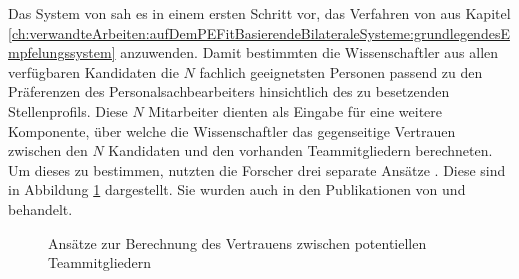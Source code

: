 Das System von \textcite[S. 4ff.]{malinowski:2005} sah es in einem ersten Schritt vor, das Verfahren von \textcite[S. 8ff.]{faerber:2003} aus Kapitel \ref{ch:verwandteArbeiten:aufDemPEFitBasierendeBilateraleSysteme:grundlegendesEmpfelungssystem} anzuwenden. Damit bestimmten die Wissenschaftler aus allen verfügbaren Kandidaten die $N$ fachlich geeignetsten Personen passend zu den Präferenzen des Personalsachbearbeiters hinsichtlich des zu besetzenden Stellenprofils. Diese $N$ Mitarbeiter dienten als Eingabe für eine weitere Komponente, über welche die Wissenschaftler das gegenseitige Vertrauen zwischen den $N$ Kandidaten und den vorhanden Teammitgliedern berechneten. Um dieses zu bestimmen, nutzten die Forscher drei separate Ansätze \cite[S. 4ff.]{malinowski:2005}. Diese sind in Abbildung \ref{fig:verwandteArbeiten:abb2} dargestellt. Sie wurden auch in den Publikationen von \textcite[S. 5ff.]{keim:2005} und \textcite[S. 6ff.]{malinowski:2008} behandelt.

\begin{figure}[h]
	\centering
	
	
	\caption[Ansätze zur Berechnung des Vertrauens zwischen potentiellen Teammitgliedern]{Ansätze zur Berechnung des Vertrauens zwischen potentiellen Teammitgliedern \cite[S. 5]{malinowski:2005}}
	\label{fig:verwandteArbeiten:abb2}
\end{figure}

